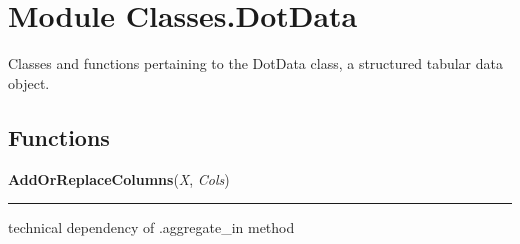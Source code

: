 %
%
%


\section{Module Classes.DotData}

    \label{Classes:DotData}
Classes and functions pertaining to the DotData class, a structured tabular
data object.



  \subsection{Functions}

    \label{Classes:DotData:AddOrReplaceColumns}

    \vspace{0.5ex}

\hspace{.8\funcindent}\begin{boxedminipage}{\funcwidth}

    \raggedright \textbf{AddOrReplaceColumns}(\textit{X}, \textit{Cols})

    \vspace{-1.5ex}

    \rule{\textwidth}{0.5\fboxrule}
\setlength{\parskip}{2ex}
    technical dependency of .aggregate\_in method

\setlength{\parskip}{1ex}
    \end{boxedminipage}

    \label{Classes:DotData:GraySpec}

    \vspace{0.5ex}

